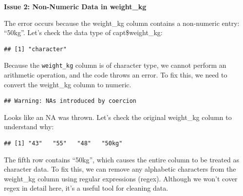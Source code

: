 \documentclass[
]{book}
\newenvironment{Shaded}{\begin{snugshade}}{\end{snugshade}}
\newcommand{\FunctionTok}[1]{\textcolor[rgb]{0.13,0.29,0.53}{\textbf{#1}}}
\newcommand{\NormalTok}[1]{#1}
\newcommand{\OtherTok}[1]{\textcolor[rgb]{0.56,0.35,0.01}{#1}}
\newcommand{\SpecialCharTok}[1]{\textcolor[rgb]{0.81,0.36,0.00}{\textbf{#1}}}
\begin{document}
\textbf{Issue 2: Non-Numeric Data in weight\_kg}

The error occurs because the weight\_kg column contains a non-numeric entry: ``50kg''. Let's check the data type of capt\$weight\_kg:

\begin{Shaded}
\end{Shaded}

\begin{verbatim}
## [1] "character"
\end{verbatim}

Because the \texttt{weight\_kg} column is of character type, we cannot perform an arithmetic operation, and the code throws an error. To fix this, we need to convert the weight\_kg column to numeric.

\begin{Shaded}
\end{Shaded}

\begin{verbatim}
## Warning: NAs introduced by coercion
\end{verbatim}

Looks like an NA was thrown. Let's check the original weight\_kg column to understand why:

\begin{Shaded}
\end{Shaded}

\begin{verbatim}
## [1] "43"   "55"   "48"   "50kg"
\end{verbatim}

The fifth row contains ``50kg'', which causes the entire column to be treated as character data. To fix this, we can remove any alphabetic characters from the weight\_kg column using regular expressions (regex). Although we won't cover regex in detail here, it's a useful tool for cleaning data.
\end{document}

